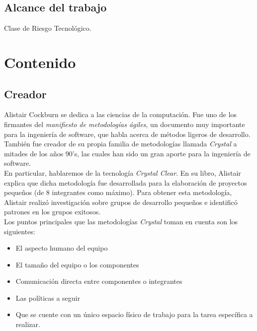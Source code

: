 \documentclass[12pt,a4paper]{article}
\begin{document}
	\subsection{Alcance del trabajo}
	Clase de Riesgo Tecnol\'ogico.
	\pagebreak
	\section{Contenido}
	\subsection*{Creador}
	Alistair Cockburn se dedica a las ciencias de la computaci\'on. Fue uno de los firmantes del {\itshape manifiesto de metodolog\'ias \'agiles}, un documento muy importante para la ingenier\'ia de software, que habla acerca de m\'etodos ligeros de desarrollo. Tambi\'en fue creador de su propia familia de metodolog\'ias llamada {\itshape Crystal} a mitades de los a\~nos 90's, las cuales han sido un gran aporte para la ingenier\'ia de software.
	\\
	En particular, hablaremos de la tecnolog\'ia {\itshape Crystal Clear}. En su libro, Alistair explica que dicha metodolog\'ia fue desarrollada para la elaboraci\'on de proyectos peque\~nos (de 8 integrantes como m\'aximo).
Para obtener esta metodolog\'ia, Alistair realiz\'o investigaci\'on sobre grupos de desarrollo peque\~nos e identific\'o patrones en los grupos exitosos.\\
	Los puntos principales que las metodolog\'ias {\itshape Crystal} toman en cuenta son los siguientes:\\
	\begin{itemize}		
		\item El aspecto humano del equipo

		\item El tama\~no del equipo o los componentes
	
		\item Comunicaci\'on directa entre componentes o integrantes
		
		\item Las pol\'iticas a seguir
	
		\item Que se cuente con un \'unico espacio f\'isico de trabajo para la tarea espec\'ifica a realizar.
	\end{itemize}
\end{document}

